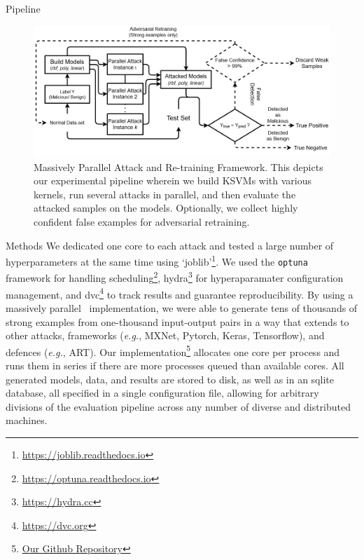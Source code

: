 \documentclass{beamer}
\begin{document}
\begin{frame}{Pipeline}
  \begin{figure}
\centering
\includegraphics[width=\textwidth]{./generated/PPGD.png}

\label{fig:attack_framework}
\caption{Massively Parallel Attack and Re-training Framework.  This depicts our experimental pipeline wherein we build KSVMs with various kernels, run several attacks in parallel, and then evaluate the attacked samples on the models. Optionally, we collect highly confident false examples for adversarial retraining.}
\end{figure}
\end{frame}

\begin{frame}{Methods}
\small
We dedicated one core to each attack and tested a large number of hyperparameters at the same time using `joblib'\footnote{\href{https://joblib.readthedocs.io}{https://joblib.readthedocs.io}}. We used the \texttt{optuna}~\cite{optuna} framework for handling scheduling\footnote{\href{https://optuna.readthedocs.io}{https://optuna.readthedocs.io}}, hydra\footnote{\href{https://hydra.cc}{https://hydra.cc}} for hyperaparamater configuration management, and dvc\footnote{\href{https://dvc.org}{https://dvc.org}} to track results and guarantee reproducibility.
  By using a massively parallel~\cite{optuna} implementation, we were able to generate tens of thousands of strong examples from one-thousand input-output pairs in a way that extends to other attacks, frameworks (\textit{e.g.}, MXNet, Pytorch, Keras, Tensorflow), and defences (\textit{e.g.}, ART). Our implementation\footnote{\href{https://github.com/simplymathematics/deckard}{Our Github Repository}} allocates one core per process and runs them in series if there are more processes queued than available cores. All generated models, data, and results are stored to disk, as well as in an sqlite database, all specified in a single configuration file, allowing for arbitrary divisions of the evaluation pipeline across any number of diverse and distributed machines.
\end{frame}
\end{document}
